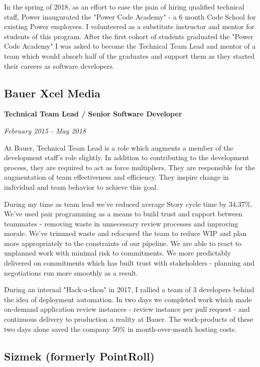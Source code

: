 \documentclass[12pt letterpaper notitlepage]{article}
\begin{document}
In the spring of 2018, as an effort to ease the pain of hiring qualified technical staff, Power inaugurated the "Power Code Academy" - a 6 month Code School for existing Power employees. I volunteered as a substitute instructor and mentor for students of this program. After the first cohort of students graduated the "Power Code Academy" I was asked to become the Technical Team Lead and mentor of a team which would absorb half of the graduates and support them as they started their careers as software developers.

\subsection*{Bauer Xcel Media}
\label{sec:org55d5681}

\textbf{Technical Team Lead / Senior Software Developer}

\emph{February 2015 - May 2018}

At Bauer, Technical Team Lead is a role which augments a member of the development staff's role slightly. In addition to contributing to the development process, they are required to act as force multipliers. They are responsible for the augmentation of team effectiveness and efficiency. They inspire change in individual and team behavior to achieve this goal.

During my time as team lead we've reduced average Story cycle time by 34.37\%. We've used pair programming as a means to build trust and rapport between teammates - removing waste in unnecessary review processes and improving morale. We've trimmed waste and refocused the team to reduce WIP and plan more appropriately to the constraints of our pipeline. We are able to react to unplanned work with minimal risk to commitments. We more predictably delivered on commitments which has built trust with stakeholders - planning and negotiations run more smoothly as a result.

During an internal "Hack-a-thon" in 2017, I rallied a team of 3 developers behind the idea of deployment automation. In two days we completed work which made on-demand application review instances - review instance per pull request - and continuous delivery to production a reality at Bauer. The work-products of these two days alone saved the company 50\% in month-over-month hosting costs.

\subsection*{Sizmek (formerly PointRoll)}
\label{sec:org197dfd9}
\end{document}
